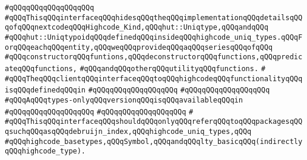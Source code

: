 \verb|#qQQqqQQqqQQqqQQqqQQq|\newline
\newline
\newline
\newline
\newline
\newline
\verb|#qQQqThisqQQqinterfaceqQQqhidesqQQqtheqQQqimplementationqQQqdetailsqQQqofqQQqnextcodeqQQqHighcode_Kind,qQQqhut::Uniqtype,qQQqandqQQq|\newline
\verb|#qQQqhut::UniqtypoidqQQqdefinedqQQqinsideqQQqhighcode_uniq_types.qQQqForqQQqeachqQQqentity,qQQqweqQQqprovideqQQqaqQQqseriesqQQqofqQQq|\newline
\verb|#qQQqconstructorqQQqfuntions,qQQqdeconstructorqQQqfunctions,qQQqpredicateqQQqfunctions,|\newline
\verb|#qQQqandqQQqotherqQQqutilityqQQqfunctions.|\newline
\verb|#|\newline
\verb|#qQQqTheqQQqclientqQQqinterfaceqQQqtoqQQqhighcodeqQQqfunctionalityqQQqisqQQqdefinedqQQqin|\newline
\verb|#qQQqqQQqqQQqqQQqqQQq|\newline
\verb|#qQQqqQQqqQQqqQQqqQQq|\newline
\verb|#qQQqAqQQqtypes-onlyqQQqversionqQQqisqQQqavailableqQQqin|\newline
\verb|#qQQqqQQqqQQqqQQqqQQq|\newline
\verb|#qQQqqQQqqQQqqQQqqQQq|\newline
\verb|#|\newline
\verb|#qQQqThisqQQqinterfaceqQQqshouldqQQqonlyqQQqreferqQQqtoqQQqpackagesqQQqsuchqQQqasqQQqdebruijn_index,qQQqhighcode_uniq_types,qQQq|\newline
\verb|#qQQqhighcode_basetypes,qQQqSymbol,qQQqandqQQqlty_basicqQQq(indirectlyqQQqhighcode_type).|\newline
\newline
\newline
